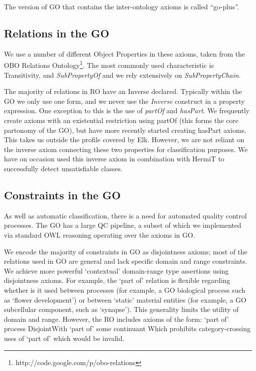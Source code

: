 \documentclass{llncs}
\begin{document}
The version of GO that contains the inter-ontology axioms is called
``go-plus''.

\subsection{Relations in the GO}

We use a number of different Object Properties in these axioms, taken
from the OBO Relations
Ontology\footnote{http://code.google.com/p/obo-relations}. The most
commonly used characteristic is Transitivity, and \emph{SubPropertyOf}
and we rely extensively on \emph{SubPropertyChain}.

The majority of relations in RO have an Inverse declared. Typically
within the GO we only use one form, and we never use the
\emph{Inverse} construct in a property expression. One exception to
this is the use of \emph{partOf} and \emph{hasPart}. We frequently
create axioms with an existential restriction using partOf (this forms
the core partonomy of the GO), but have more recently started creating
hasPart axioms\cite{berardini2010gene}. This takes us outside the
profile covered by Elk. However, we are not reliant on the inverse
axiom connecting these two properties for classification purposes. We
have on occasion used this inverse axiom in combination with HermiT to
successfully detect unsatisfiable classes.

\subsection{Constraints in the GO}

As well as automatic classification, there is a need for automated
quality control processes. The GO has a large QC pipeline, a subset of
which we implemented via standard OWL reasoning operating over the
axioms in GO.

We encode the majority of constraints in GO as disjointness axioms;
most of the relations used in GO are general and lack specific domain
and range constraints. We achieve more powerful ‘contextual’
domain-range type assertions using disjointness axioms. For example,
the `part of' relation is flexible regarding whether is it used
between processes (for example, a GO biological process such as
‘flower development’) or between ‘static’ material entities (for
example, a GO subcellular component, such as ‘synapse’). This
generality limits the utility of domain and range. However, the RO
includes axioms of the form: `part of' process DisjointWith `part of'
some continuant Which prohibits category-crossing uses of `part of'
which would be invalid.
\end{document}

